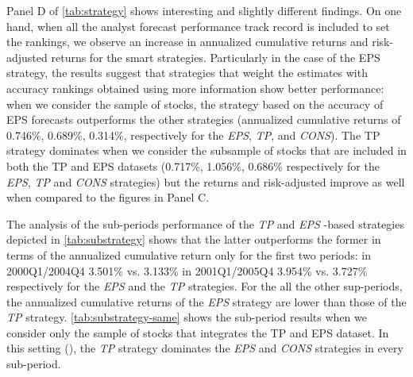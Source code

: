 \documentclass[a4paper,12pt,openright,notitlepage]{report}\usepackage[]{graphicx}\usepackage[]{color}
\begin{document}
Panel D of \ref{tab:strategy} shows interesting and slightly different findings. On one hand, when all the analyst forecast performance track record is included to set the rankings, we observe an increase in annualized cumulative returns and risk-adjusted returns for the smart strategies. Particularly in the case of the EPS strategy, the results suggest that strategies that weight the estimates with accuracy rankings obtained using more information show better performance: when we consider the \all{} sample of stocks, the strategy based on the accuracy of EPS forecasts outperforms the other strategies (annualized cumulative returns of 0.746\%, 0.689\%, 0.314\%, respectively for the \textit{EPS}, \textit{TP}, and \textit{CONS}). The TP strategy dominates when we consider the subsample of stocks that are included in both the TP and EPS datasets (0.717\%, 1.056\%, 0.686\% respectively for the \textit{EPS}, \textit{TP} and \textit{CONS} strategies) but the returns and risk-adjusted improve as well when compared to the figures in Panel C.




The analysis of the sub-periods performance of the \textit{TP} and \textit{EPS} -based strategies depicted in \ref{tab:substrategy} shows that the latter outperforms the former in terms of the annualized cumulative return only for the first two periods: in  2000Q1/2004Q4  3.501\% vs. 3.133\%  in 2001Q1/2005Q4 3.954\%  vs. 3.727\% respectively for the \textit{EPS} and the \textit{TP} strategies. For the all the other sup-periods, the annualized cumulative returns of the \textit{EPS} strategy are lower than those of the \textit{TP} strategy.
\ref{tab:substrategy-same} shows the sub-period results when we consider only the sample of stocks that integrates the TP and EPS dataset. In this setting (\same{}), the \textit{TP} strategy dominates the \textit{EPS} and \textit{CONS} strategies in every sub-period.
\end{document}
